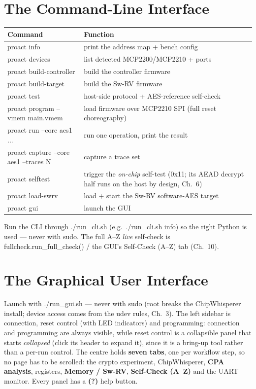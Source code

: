 \documentclass[11pt,a4paper]{report}
\newcommand{\code}[1]{{\ttfamily\small #1}}
\begin{document}
\chapter{The Command-Line Interface}
\begin{center}
\begin{tabular}{p{5.5cm}p{8.5cm}}
\toprule
Command & Function \\ \midrule
\code{proact info} & print the address map + bench config \\
\code{proact devices} & list detected MCP2200/MCP2210 + ports \\
\code{proact build-controller} & build the controller firmware \\
\code{proact build-target} & build the Sw-RV firmware \\
\code{proact test} & host-side protocol + AES-reference self-check \\
\code{proact program --vmem main.vmem} & load firmware over MCP2210 SPI (full reset choreography) \\
\code{proact run --core aes1 ...} & run one operation, print the result \\
\code{proact capture --core aes1 --traces N} & capture a trace set \\
\code{proact selftest} & trigger the \emph{on-chip} self-test (\code{0x11}; its AEAD decrypt half runs on the host by design, Ch.~6) \\
\code{proact load-swrv} & load + start the Sw-RV software-AES target \\
\code{proact gui} & launch the GUI \\
\bottomrule
\end{tabular}\end{center}
Run the CLI through \code{./run\_cli.sh} (e.g.\ \code{./run\_cli.sh info}) so the
right Python is used --- never with \code{sudo}. The full A--Z \emph{live}
self-check is \code{fullcheck.run\_full\_check()} / the GUI's Self-Check
(A--Z) tab (Ch.~10).

\chapter{The Graphical User Interface}
Launch with \code{./run\_gui.sh} --- never with \code{sudo} (root breaks the
ChipWhisperer install; device access comes from the udev rules, Ch.~3). The
left sidebar is connection, reset control (with LED indicators) and programming:
connection and programming are always visible, while reset control is a
collapsible panel that starts \emph{collapsed} (click its header to expand it),
since it is a bring-up tool rather than a per-run control. The centre holds
\textbf{seven tabs}, one per workflow step, so no page has to be scrolled: the
crypto experiment, ChipWhisperer, \textbf{CPA analysis}, registers,
\textbf{Memory / Sw-RV}, \textbf{Self-Check (A--Z)} and the UART monitor. Every
panel has a \textbf{(?)} help button.
\end{document}
